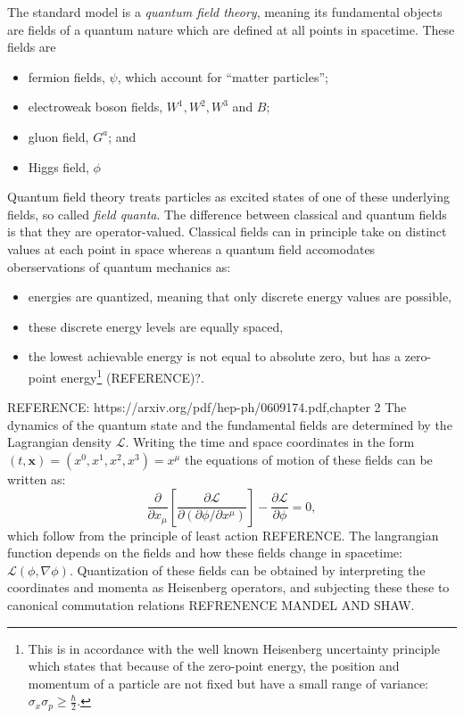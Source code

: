 The standard model is a \textit{quantum field theory}, meaning its fundamental objects are fields of a quantum nature which are defined at all points in spacetime. These fields are
\begin{itemize}
\item fermion fields, $\psi$, which account for ``matter particles'';
\item electroweak boson fields, $W^1, W^2, W^3$ and $B$;
\item gluon field, $G^a$; and
\item Higgs field, $\phi$
\end{itemize}
Quantum field theory treats particles as excited states of one of these underlying fields, so called \textit{field quanta}. The difference between classical and quantum fields is that they are operator-valued. Classical fields can in principle take on distinct values at each point in space whereas a quantum field accomodates oberservations of quantum mechanics as:
\begin{itemize}
\item energies are quantized, meaning that only discrete energy values are possible,
\item these discrete energy levels are equally spaced,
\item the lowest achievable energy is not equal to absolute zero, but has a zero-point energy\footnote{This is in accordance with the well known Heisenberg uncertainty principle which states that because of the zero-point energy, the position and momentum of a particle are not fixed but have a small range of variance: $\sigma_x\sigma_p \geq \frac{\hbar }{2}$.} (REFERENCE)?.
\end{itemize}

REFERENCE: https://arxiv.org/pdf/hep-ph/0609174.pdf,chapter 2
The dynamics of the quantum state and the fundamental fields are determined by the Lagrangian density $\mathcal{L}$. Writing the time and space coordinates in the form $(t,\mathbf{x}) = (x^0, x^1, x^2, x^3) = x^\mu$ the equations of motion of these fields can be written as:
\begin{equation}
\frac{\partial}{\partial x_{\mu}}\left[\frac{\partial \mathcal{L}}{\partial\left(\partial\phi/\partial x^{\mu}\right)}\right] - \frac{\partial \mathcal{L}}{\partial \phi} = 0,
\end{equation}
which follow from the principle of least action REFERENCE. The langrangian function depends on the fields and how these fields change in spacetime: $\mathcal{L(\phi,\nabla\phi)}$. Quantization of these fields can be obtained by interpreting the coordinates and momenta as Heisenberg operators, and subjecting these these to canonical commutation relations REFRENENCE MANDEL AND SHAW. 

